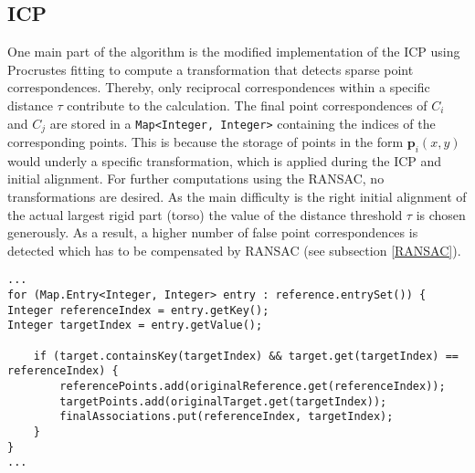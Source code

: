 \subsection{ICP}
One main part of the algorithm is the modified implementation of the ICP using Procrustes fitting to compute a transformation that detects sparse point correspondences. Thereby, only reciprocal correspondences within a specific distance $\tau$ contribute to the calculation. The final point correspondences of $C_i$ and $C_j$ are stored in a \texttt{Map<Integer, Integer>} containing the indices of the corresponding points. This is because the storage of points in the form $\boldsymbol{p}_i(x,y)$ would underly a specific transformation, which is applied during the ICP and initial alignment. For further computations using the RANSAC, no transformations are desired. As the main difficulty is the right initial alignment of the actual largest rigid part (torso) the value of the distance threshold $\tau$ is chosen generously. As a result, a higher number of false point correspondences is detected which has to be compensated by RANSAC (see subsection \ref{RANSAC}).

\begin{lstlisting}
...
for (Map.Entry<Integer, Integer> entry : reference.entrySet()) {
Integer referenceIndex = entry.getKey();
Integer targetIndex = entry.getValue();

	if (target.containsKey(targetIndex) && target.get(targetIndex) == referenceIndex) {
		referencePoints.add(originalReference.get(referenceIndex));
		targetPoints.add(originalTarget.get(targetIndex));
		finalAssociations.put(referenceIndex, targetIndex);
	}
}
...
\end{lstlisting}

